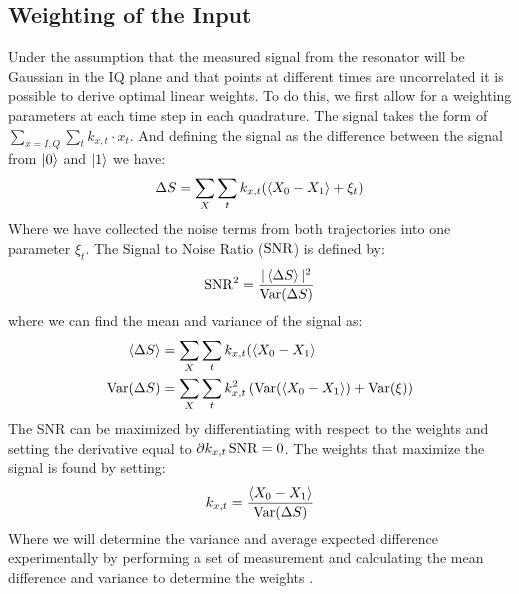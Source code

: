 \subsection{Weighting of the Input}
Under the assumption that the measured signal from the resonator will be Gaussian in the IQ plane and that points at different times are uncorrelated \cite{magesan_machine_2015}  it is possible to derive optimal linear weights. To do this, we first allow for a weighting parameters at each time step in each quadrature. The signal takes the form of $\sum_{x = I, Q}\sum_t k_{x, t} \cdot x_t$. And defining the signal as the difference between the signal from $\ket{0}$ and $\ket{1}$ we have:
\begin{equation}
    \Delta S = \sum_X \sum_t k_{x, t} (\expval{X_0 - X_1} + \xi_t)
\end{equation}
Where we have collected the noise terms from both trajectories into one parameter $\xi_t$. The Signal to Noise Ratio ($\operatorname{SNR}$) is defined by: %
\begin{equation}
    \operatorname{SNR}^2 = \frac{|\expval{\Delta S}|^2}{\operatorname{Var}(\Delta S)} 
\end{equation}
where we can find the mean and variance of the signal as:
\begin{align}
    \expval{\Delta S} &= \sum_X \sum_t k_{x, t} (\expval{X_0 - X_1} \\
    \operatorname{Var}(\Delta S) &= \sum_X \sum_t k_{x, t}^2 \left( \operatorname{Var}(\expval{X_0 - X_1}) + \operatorname{Var}(\xi) \right)
\end{align}
The SNR can be maximized by differentiating with respect to the weights and setting the derivative equal to $\partial k_{x, t} \operatorname{SNR} = 0$. The weights that maximize the signal is found by  setting:
\begin{equation}
    k_{x, t} = \frac{\expval{X_0 - X_1}}{\operatorname{Var}(\Delta S)}
\end{equation}
Where we will determine the variance and average expected difference experimentally by performing a set of measurement and calculating the mean difference and variance to determine the weights \cite{ryan_tomography_2015}.

